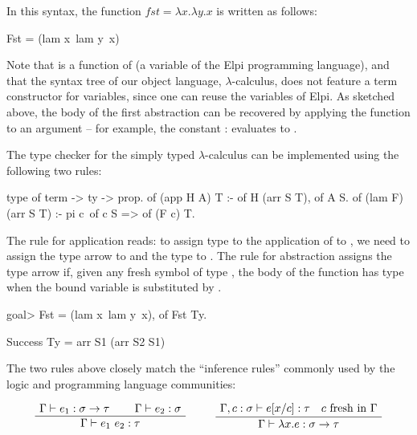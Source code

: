 \documentclass[a4paper, 11pt]{book}
\newenvironment{bprooftree}
  {\leavevmode\hbox\bgroup}
  {\DisplayProof\egroup}
\begin{document}
In this syntax, the function $fst = \lambda x.\lambda y.x$ is written as
follows:

\begin{elpicode}
Fst = (lam x\ lam y\ x)
\end{elpicode}

Note that  is a function of  (a variable of the
Elpi programming language), and that the syntax tree of our object language,
$\lambda$-calculus, does not feature a term constructor for variables, since
one can reuse the variables of Elpi. As sketched above, the body of the first
abstraction can be recovered by applying the function to an argument -- for
example, the constant :  evaluates to
.



The type checker for the simply typed $\lambda$-calculus can be implemented
using the following two rules:

\begin{elpicode}
type of term -> ty -> prop.
of (app H A) T :- of H (arr S T), of A S.
of (lam F) (arr S T) :- pi c\ of c S => of (F c) T.
\end{elpicode}

The rule for application reads: to assign type  to the application of
 to , we need to assign the type  arrow  to
 and the type  to . The rule for abstraction assigns
the type  arrow  if, given any fresh symbol  of type
, the body of the function  has type  when the bound
variable is substituted by .

\begin{elpicode}
goal> Fst = (lam x\ lam y\ x), of Fst Ty.

Success
  Ty = arr S1 (arr S2 S1)
\end{elpicode}

The two rules above closely match the ``inference rules'' commonly used by the
logic and programming language communities:
\label{inf:stlc}

$$
\begin{bprooftree}
  \AxiomC{$\Gamma \vdash e_1 : \sigma \to \tau$}
  \AxiomC{$\Gamma \vdash e_2 : \sigma$}
  \BinaryInfC{$\Gamma \vdash e_1~e_2 : \tau$}
\end{bprooftree}
\qquad
\begin{bprooftree}
  \AxiomC{$\Gamma, c : \sigma \vdash e[x/c] : \tau \quad c~\mathrm{fresh~in}~\Gamma$}
  \UnaryInfC{$\Gamma \vdash \lambda x.e : \sigma \to \tau$}
\end{bprooftree}
$$
\end{document}
